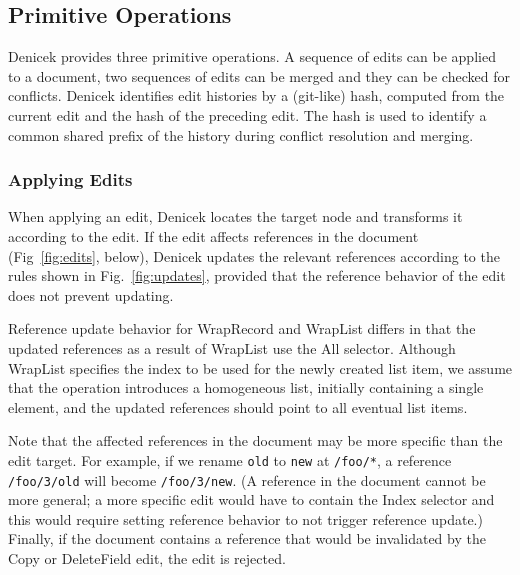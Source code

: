 \documentclass[sigconf,anonymous,screen]{acmart}
\newcommand{\ident}[1]{{\sffamily #1}}
\begin{document}

\subsection{Primitive Operations}
\label{sec:system-ops}
Denicek provides three primitive operations. A sequence of edits can be applied to a
document, two sequences of edits can be merged and they can be checked for conflicts. Denicek
identifies edit histories by a (git-like) hash, computed from the current edit and the hash of the
preceding edit. The hash is used to identify a common shared prefix of the
history during conflict resolution and merging.

\subsubsection*{Applying Edits}
When applying an edit, Denicek locates the target node and transforms it according to the edit. If
the edit affects references in the document (Fig~\ref{fig:edits}, below), Denicek updates
the relevant references according to the rules shown in Fig.~\ref{fig:updates}, provided
that the reference behavior of the edit does not prevent updating.

Reference update behavior for \ident{WrapRecord} and \ident{WrapList} differs in that the updated
references as a result of \ident{WrapList} use the \ident{All} selector. Although \ident{WrapList}
specifies the index to be used for the newly created list item, we assume that the operation
introduces a homogeneous list, initially containing a single element, and the updated references
should point to all eventual list items.

Note that the affected references in the document may be more specific than the edit target. For
example, if we rename {\small\Verb|old|} to {\small\Verb|new|} at {\small\Verb|/foo/*|}, a reference
{\small\Verb|/foo/3/old|} will become {\small\Verb|/foo/3/new|}. (A reference in the
document cannot be more general; a more specific edit would have to contain the \ident{Index} selector
and this would require setting reference behavior to not trigger reference update.) Finally,
if the document contains a reference that would be invalidated by the \ident{Copy} or
\ident{DeleteField} edit, the edit is rejected.

\end{document}
